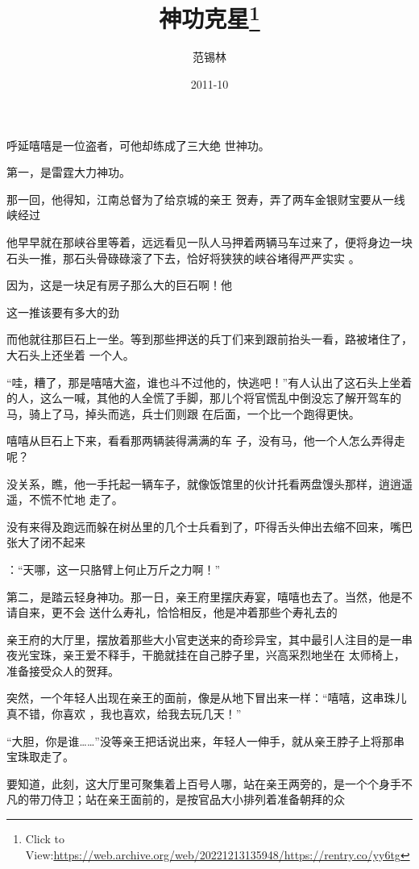 \documentclass{article}
\title{神功克星\footnote{Click to View:\url{https://web.archive.org/web/20221213135948/https://rentry.co/yy6tg}}}
\author{范锡林}
\date{2011-10}
\begin{document}

\maketitle


\Large

﻿呼延嘻嘻是一位盗者，可他却练成了三大绝
世神功。 


第一，是雷霆大力神功。 

那一回，他得知，江南总督为了给京城的亲王
贺寿，弄了两车金银财宝要从一线峡经过 

他早早就在那峡谷里等着，远远看见一队人马押着两辆马车过来了，便将身边一块石头一推，那石头骨碌碌滚了下去，恰好将狭狭的峡谷堵得严严实实
。 

因为，这是一块足有房子那么大的巨石啊！他

\newpage
这一推该要有多大的劲 

而他就往那巨石上一坐。等到那些押送的兵丁们来到跟前抬头一看，路被堵住了，大石头上还坐着
一个人。 

“哇，糟了，那是嘻嘻大盗，谁也斗不过他的，快逃吧！”有人认出了这石头上坐着的人，这么一喊，其他的人全慌了手脚，那儿个将官慌乱中倒没忘了解开驾车的马，骑上了马，掉头而逃，兵士们则跟
在后面，一个比一个跑得更快。 

嘻嘻从巨石上下来，看看那两辆装得满满的车
子，没有马，他一个人怎么弄得走呢？ 

没关系，瞧，他一手托起一辆车子，就像饭馆里的伙计托看两盘馒头那样，逍逍遥遥，不慌不忙地
走了。 

没有来得及跑远而躲在树丛里的几个士兵看到了，吓得舌头伸出去缩不回来，嘴巴张大了闭不起来

\newpage
：“天哪，这一只胳臂上何止万斤之力啊！” 

第二，是踏云轻身神功。那一日，亲王府里摆庆寿宴，嘻嘻也去了。当然，他是不请自来，更不会
送什么寿礼，恰恰相反，他是冲着那些个寿礼去的 

亲王府的大厅里，摆放着那些大小官吏送来的奇珍异宝，其中最引人注目的是一串夜光宝珠，亲王爱不释手，干脆就挂在自己脖子里，兴高采烈地坐在
太师椅上，准备接受众人的贺拜。 

突然，一个年轻人出现在亲王的面前，像是从地下冒出来一样：“嘻嘻，这串珠儿真不错，你喜欢
，我也喜欢，给我去玩几天！” 

“大胆，你是谁……”没等亲王把话说出来，年轻人一伸手，就从亲王脖子上将那串宝珠取走了。
 

要知道，此刻，这大厅里可聚集着上百号人哪，站在亲王两旁的，是一个个身手不凡的带刀侍卫；站在亲王面前的，是按官品大小排列着准备朝拜的众
\newpage
\end{document}

